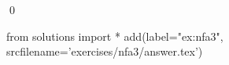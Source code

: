 
\begin{ex} 
  \label{ex:nfa3}
  
  \qed
\end{ex} 
\begin{python0}
from solutions import *
add(label="ex:nfa3",
    srcfilename='exercises/nfa3/answer.tex') 
\end{python0}
